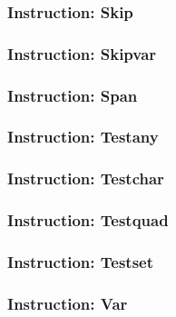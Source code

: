 \subsubsection{Instruction: Skip}

\subsubsection{Instruction: Skipvar}

\subsubsection{Instruction: Span}

\subsubsection{Instruction: Testany}

\subsubsection{Instruction: Testchar}

\subsubsection{Instruction: Testquad}

\subsubsection{Instruction: Testset}

\subsubsection{Instruction: Var}
